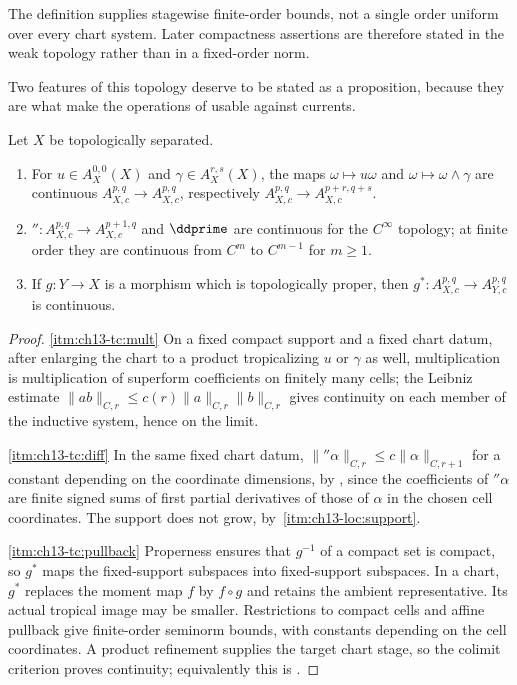 The definition supplies stagewise finite-order bounds, not a single order
uniform over every chart system.  Later compactness assertions are therefore
stated in the weak topology rather than in a fixed-order norm.

Two features of this topology deserve to be stated as a proposition, because
they are what make the operations of  usable
against currents.

\begin{proposition}
\label{prop:ch13-test-continuity}
Let $X$ be topologically separated.
\begin{enumerate}
\item\label{itm:ch13-tc:mult} For $u\in A^{0,0}_X(X)$ and
  $\gamma\in A^{r,s}_X(X)$, the maps $\omega\mapsto u\omega$ and
  $\omega\mapsto\omega\wedge\gamma$ are continuous
  $A^{p,q}_{X,c}\to A^{p,q}_{X,c}$, respectively
  $A^{p,q}_{X,c}\to A^{p+r,q+s}_{X,c}$.
\item\label{itm:ch13-tc:diff} $\dprime:A^{p,q}_{X,c}\to A^{p+1,q}_{X,c}$
  and $\ddprime$ are continuous for the $C^\infty$ topology; at finite order
  they are continuous from $C^m$ to $C^{m-1}$ for $m\ge1$.
\item\label{itm:ch13-tc:pullback} If $g:Y\to X$ is a morphism which is
  topologically proper, then $g^*:A^{p,q}_{X,c}\to A^{p,q}_{Y,c}$ is
  continuous.
\end{enumerate}
\end{proposition}

\begin{proof}
\cref{itm:ch13-tc:mult} On a fixed compact support and a fixed chart datum,
after enlarging the chart to a product tropicalizing $u$ or $\gamma$ as well,
multiplication is multiplication of superform coefficients on finitely many
cells; the Leibniz estimate
$\|ab\|_{C,r}\le c(r)\|a\|_{C,r}\|b\|_{C,r}$ gives continuity on each member
of the inductive system, hence on the limit.

\cref{itm:ch13-tc:diff} In the same fixed chart datum,
$\|\dprime\alpha\|_{C,r}\le c\|\alpha\|_{C,r+1}$ for a constant
depending on the coordinate dimensions, by
, since the coefficients of $\dprime\alpha$ are
finite signed sums of first partial derivatives of those of $\alpha$
in the chosen cell coordinates.  The support does not grow, by
\,\cref{itm:ch13-loc:support}.

\cref{itm:ch13-tc:pullback} Properness ensures that $g^{-1}$ of a compact set
is compact, so $g^*$ maps the fixed-support subspaces into fixed-support
subspaces.  In a chart, $g^*$ replaces the moment map $f$ by $f\circ g$
and retains the ambient representative.  Its actual tropical image may
be smaller.  Restrictions to compact cells and affine pullback give
finite-order seminorm bounds, with constants depending on the cell
coordinates.  A product refinement supplies the target chart stage,
so the colimit criterion proves continuity; equivalently this is
\cite[Proposition~6.4.3]{CLD25}.
\end{proof}


